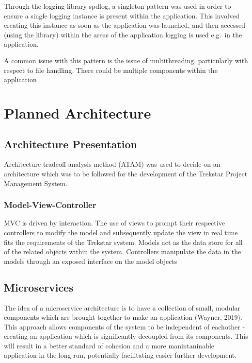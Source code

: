 \documentclass[
  english,
  a4paper,
,tablecaptionabove
]{scrartcl}
\begin{document}
Through the logging library spdlog, a singleton pattern was used in
order to ensure a single logging instance is present within the
application. This involved creating this instance as soon as the
application was launched, and then accessed (using the library) within
the areas of the application logging is used e.g.~in the application.

A common issue with this pattern is the issue of multithreading,
particularly with respect to file handling. There could be multiple
components within the application

\newpage

\hypertarget{planned-architecture}{%
\section{Planned Architecture}\label{planned-architecture}}

\hypertarget{architecture-presentation}{%
\subsection{Architecture Presentation}\label{architecture-presentation}}

Architecture tradeoff analysis method (ATAM) was used to decide on an
architecture which was to be followed for the development of the
Trekstar Project Management System.

\hypertarget{model-view-controller}{%
\subsubsection{Model-View-Controller}\label{model-view-controller}}

MVC is driven by interaction. The use of views to prompt their
respective controllers to modify the model and subsequently update the
view in real time fits the requirements of the Trekstar system. Models
act as the data store for all of the related objects within the system.
Controllers manipulate the data in the models through an exposed
interface on the model objects

\hypertarget{microservices}{%
\subsection{Microservices}\label{microservices}}

The idea of a microservice architecture is to have a collection of
small, modular components which are brought together to make an
application (Wayner, 2019). This approach allows components of the
system to be independent of eachother - creating an application which is
significantly decoupled from its components. This will result in a
better standard of cohesion and a more manintaninable application in the
long-run, potentially facilitating easier further development.
\end{document}
